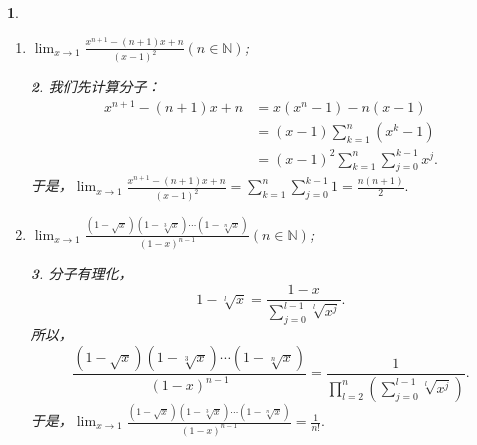 \documentclass[utf8]{book}
\newtheorem{example}{}[section]             %
\newtheorem{solution}{}
\begin{document}
\begin{example}
\begin{enumerate}
\begin{solution}
\begin{equation*}
\begin{split}
(x^n-a^n)-na^{n-1}(x-a)&=(x-a)\displaystyle\sum_{k=0}^{n-2}a^k(x^{n-1-k}-a^{n-1-k})\\
&=(x-a)^2\displaystyle\sum_{k=0}^{n-2}a^k\displaystyle\sum_{j=0}^{n-2-k}a^jx^{n-2-k-j}.
\end{split}
\end{equation*}
于是，
$\displaystyle\lim_{x\to a}\frac{(x^n-a^n)-na^{n-1}(x-a)}{(x-a)^2}=a^{n-2}\displaystyle\sum_{k=0}^{n-2}(n-1-k)=\frac{n(n-1)}{2}a^{n-2}$.
\end{solution}
\item $\displaystyle\lim_{x\to 1}\frac{x^{n+1}-(n+1)x+n}{(x-1)^2}(n\in\mathbb{N})$;
\begin{solution}我们先计算分子：
\begin{equation*}
\begin{split}
x^{n+1}-(n+1)x+n&=x(x^{n}-1)-n(x-1)\\&=
(x-1)\displaystyle\sum_{k=1}^{n}(x^k-1)\\&=
(x-1)^2\displaystyle\sum_{k=1}^{n}\displaystyle\sum_{j=0}^{k-1}x^j.
\end{split}
\end{equation*}
于是，$\displaystyle\lim_{x\to 1}\frac{x^{n+1}-(n+1)x+n}{(x-1)^2}=\displaystyle\sum_{k=1}^{n}\displaystyle\sum_{j=0}^{k-1}1=\frac{n(n+1)}{2}.$
\end{solution}
\item $\displaystyle\lim_{x\to 1}\frac{(1-\sqrt{x})(1-\sqrt[3]{x})\cdots(1-\sqrt[n]{x})}{(1-x)^{n-1}}(n\in\mathbb{N})$;
\begin{solution}分子有理化，$$1-\sqrt[l]{x}=\frac{1-x}{\displaystyle\sum_{j=0}^{l-1}\sqrt[l]{x^j}}.$$
所以，
$$\frac{(1-\sqrt{x})(1-\sqrt[3]{x})\cdots(1-\sqrt[n]{x})}{(1-x)^{n-1}}=\frac{1}{\displaystyle\prod_{l=2}^{n}\left(\displaystyle\sum_{j=0}^{l-1}\sqrt[l]{x^j}\right)}.$$
于是，$\displaystyle\lim_{x\to 1}\frac{(1-\sqrt{x})(1-\sqrt[3]{x})\cdots(1-\sqrt[n]{x})}{(1-x)^{n-1}}=\frac{1}{n!}.$
\end{solution}
\end{enumerate}
\end{example}
\end{document}

